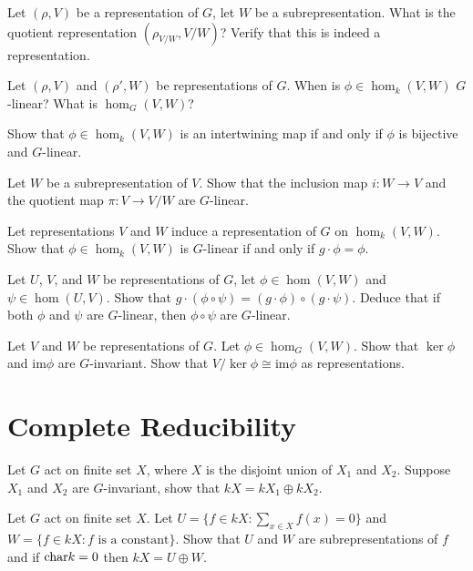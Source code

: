 \begin{question}{6}
	Let $(\rho,V)$ be a representation of $G$, let $W$ be a subrepresentation. What is the quotient representation $(\rho_{V/W}, V/W)$? Verify that this is indeed a representation.
	
	Let $(\rho,V)$ and $(\rho', W)$ be representations of $G$.  When is $\phi \in \hom_k(V,W)$ $G$-linear? What is $\hom_G(V,W)$?
	
	Show that $\phi \in \hom_k(V,W)$ is an intertwining map if and only if $\phi$ is bijective and $G$-linear.
	
	Let $W$ be a subrepresentation of $V$. Show that the inclusion map $i : W \rightarrow V$ and the quotient map $\pi : V \rightarrow V/W$ are $G$-linear.
	
	Let representations $V$ and $W$ induce a representation of $G$ on $\hom_k(V,W)$. Show that $\phi \in \hom_k(V,W)$ is $G$-linear if and only if $g \cdot \phi = \phi$.
\end{question}

\begin{question}{7}
	Let $U$, $V$, and $W$ be representations of $G$, let $\phi \in \hom(V,W)$ and $\psi \in \hom(U,V)$. Show that $g \cdot (\phi \circ \psi) = (g \cdot \phi) \circ (g \cdot \psi)$. Deduce that if both $\phi$ and $\psi$ are $G$-linear, then $\phi \circ \psi$ are $G$-linear.
\end{question}

\begin{question}{8}
	Let $V$ and $W$ be representations of $G$. Let $\phi \in \hom_G(V,W)$. Show that $\ker \phi$ and $\text{im} \phi$ are $G$-invariant. Show that $V/\ker \phi \cong \text{im}\phi$ as representations.
\end{question}

\section{Complete Reducibility}
\begin{question}{9}
	Let $G$ act on finite set $X$, where $X$ is the disjoint union of $X_1$ and $X_2$. Suppose $X_1$ and $X_2$ are $G$-invariant, show that $kX = kX_1 \oplus kX_2$.
	
	Let $G$ act on finite set $X$. Let $U = \{f\in kX: \sum_{x\in X} f(x) = 0\}$ and $W=\{f\in kX: f \text{ is a constant}\}$. Show that $U$ and $W$ are subrepresentations of $f$ and if $\text{char} k = 0$ then $kX = U \oplus W$.
\end{question}

